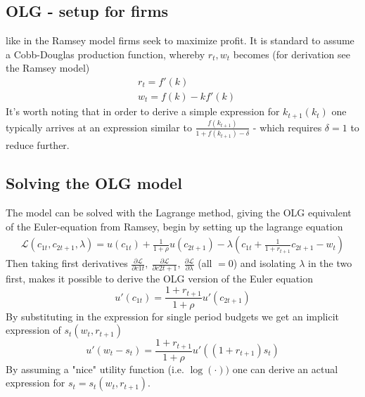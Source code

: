 \documentclass[12pt, a4paper]{article}
\begin{document}
\begin{spacing}{1.213}
\subsection{OLG - setup for firms}
like in the Ramsey model firms seek to maximize profit. It is standard to assume a Cobb-Douglas production function, whereby $r_t,w_t$ becomes (for derivation see the Ramsey model)
\begin{align*}
&r_t = f'(k) \\
&w_t = f(k) - kf'(k)
\end{align*}
It's worth noting that in order to derive a simple expression for $k_{t+1}(k_t)$ one typically arrives at an expression similar to $\frac{f(k_{t+1})}{1+f(k_{t+1})- \delta}$ - which requires $\delta =1$ to reduce further. 
\subsection{Solving the OLG model}
The model can be solved with the Lagrange method, giving the OLG equivalent of the Euler-equation from Ramsey, begin by setting up the lagrange equation
\begin{align*}
\mathcal{L}(c_{1t},c_{2t+1},\lambda) =  u(c_{1t}) + \frac{1}{1+ \rho} u(c_{2t+1}) - \lambda(c_{1t} + \frac{1}{1+ r_{t+1}} c_{2t+1} - w_t)
\end{align*}
Then taking first derivatives $\frac{\partial \mathcal{L}}{\partial c{1t}}, \ \frac{\partial \mathcal{L}}{\partial c{2t+1}}, \ \frac{\partial \mathcal{L}}{\partial \lambda}$ (all $=0$) and isolating $\lambda$ in the two first, makes it possible to derive the OLG version of the Euler equation
\begin{equation}
u'(c_{1t}) = \frac{1 + r_{t+1}}{1+ \rho}u'( c_{2t+1})
\end{equation}
By substituting in the expression for single period budgets we get an implicit expression of $s_t(w_t, r_{t+1})$
\begin{equation}
u'(w_t - s_t) = \frac{1 + r_{t+1}}{1+ \rho}u'( (1+r_{t+1})s_t)
\end{equation}
By assuming a "nice" utility function (i.e. $\log(\cdot))$ one can derive an actual expression for $s_t=s_t(w_t, r_{t+1})$.


\end{spacing}
\end{document}
